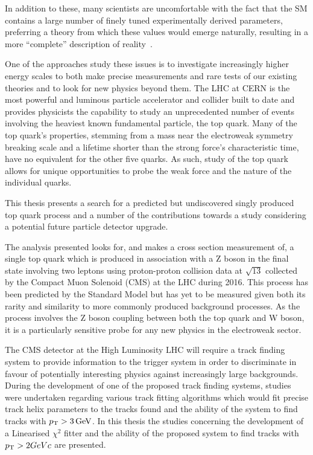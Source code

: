 In addition to these, many scientists are uncomfortable with the fact that the SM contains a large number of finely tuned experimentally derived parameters, preferring a theory from which these values would emerge naturally, resulting in a more ``complete'' description of reality~\cite{Burdman:2007ck}.

One of the approaches study these issues is to investigate increasingly higher energy scales to both make precise measurements and rare tests of our existing theories and to look for new physics beyond them.
The LHC at CERN is the most powerful and luminous particle accelerator and collider built to date and provides physicists the capability to study an unprecedented number of events involving the heaviest known fundamental particle, the top quark.
Many of the top quark's properties, stemming from a mass near the electroweak symmetry breaking scale and a lifetime shorter than the strong force’s characteristic time, have no equivalent for the other five quarks.
As such, study of the top quark allows for unique opportunities to probe the weak force and the nature of the individual quarks.

This thesis presents a search for a predicted but undiscovered singly produced top quark process and a number of the contributions towards a study considering a potential future particle detector upgrade.

The analysis presented looks for, and makes a cross section measurement of, a single top quark which is produced in association with a Z boson in the final state involving two leptons using proton-proton collision data at $\sqrt{13}$ collected by the Compact Muon Solenoid (CMS) at the LHC during 2016.
This process has been predicted by the Standard Model but has yet to be measured given both its rarity and similarity to more commonly produced background processes.
As the process involves the Z boson coupling between both the top quark and W boson, it is a particularly sensitive probe for any new physics in the electroweak sector.

The CMS detector at the High Luminosity LHC will require a track finding system to provide information to the trigger system in order to discriminate in favour of potentially interesting physics against increasingly large backgrounds.
During the development of one of the proposed track finding systems, studies were undertaken regarding various track fitting algorithms which would fit precise track helix parameters to the tracks found and the ability of the system to find tracks with $p_{\mathrm{T}} > 3\,\text{Ge\hspace{-.08em}V}$.
In this thesis the studies concerning the development of a Linearised $\chi^{2}$ fitter and the ability of the proposed system to find tracks with $p_{\mathrm{T}} > 2GeVc$ are presented.


